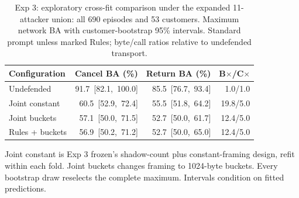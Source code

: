 \begin{table}[t]\centering\footnotesize\setlength{\tabcolsep}{2pt}
\caption{Exp 3: exploratory cross-fit comparison under the expanded 11-attacker union: all 690 episodes and 53 customers. Maximum network BA with customer-bootstrap 95\% intervals. Standard prompt unless marked Rules; byte/call ratios relative to undefended transport. }\label{tab:r5}
\begin{tabular}{@{}lrrr@{}}\toprule
Configuration & Cancel BA (\%) & Return BA (\%) & B$\times$/C$\times$\\\midrule
Undefended & \mbox{91.7 [82.1, 100.0]} & \mbox{85.5 [76.7, 93.4]} & 1.0/1.0\\
Joint constant & \mbox{60.5 [52.9, 72.4]} & \mbox{55.5 [51.8, 64.2]} & 19.8/5.0\\
Joint buckets & \mbox{57.1 [50.0, 71.5]} & \mbox{52.7 [50.0, 61.7]} & 12.4/5.0\\
Rules + buckets & \mbox{56.9 [50.2, 71.2]} & \mbox{52.7 [50.0, 65.0]} & 12.4/5.0\\
\bottomrule\end{tabular}
\par\smallskip\raggedright Joint constant is Exp 3 frozen's shadow-count plus constant-framing design, refit within each fold. Joint buckets changes framing to 1024-byte buckets. Every bootstrap draw reselects the complete maximum. Intervals condition on fitted predictions.
\end{table}
